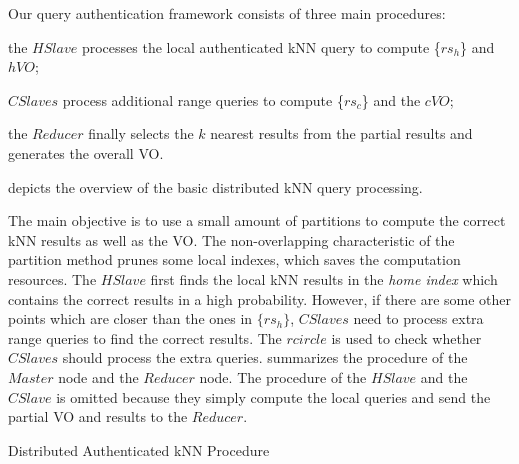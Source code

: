 Our query authentication framework consists of three main procedures:
\begin{inlineenum}
\item the $HSlave$ processes the local authenticated kNN query to compute \{$rs_{h}$\} and $hVO$;
\item $CSlaves$ process additional range queries to compute \{$rs_{c}$\} and the $cVO$;
\item the $Reducer$ finally selects the $k$ nearest results from the partial results and generates the overall VO\@.
\end{inlineenum}
 depicts the overview of the basic distributed kNN query processing.

The main objective is to use a small amount of partitions to compute the correct kNN results as well as the VO\@. The non-overlapping characteristic of the partition method prunes some local indexes, which saves the computation resources. The $HSlave$ first finds the local kNN results in the \emph{home index} which contains the correct results in a high probability. However, if there are some other points which are closer than the ones in $\{rs_{h}\}$, $CSlaves$ need to process extra range queries to find the correct results. The $rcircle$ is used to check whether $CSlaves$ should process the extra queries.  summarizes the procedure of the $Master$ node and the $Reducer$ node. The procedure of the $HSlave$ and the $CSlave$ is omitted because they simply compute the local queries and send the partial VO and results to the $Reducer$.

\begin{algorithm}[t]
  \caption{Distributed Authenticated kNN Procedure}\label{alg:knn:master}
\end{algorithm}

